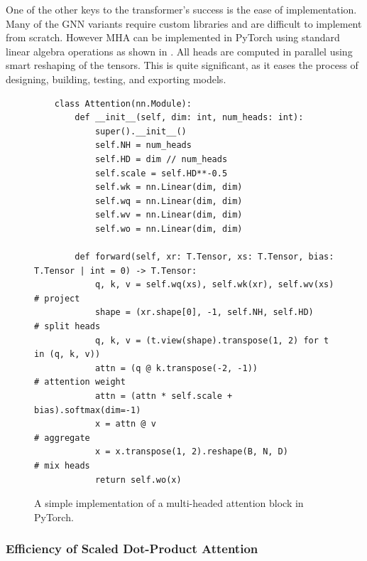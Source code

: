 One of the other keys to the transformer's success is the ease of implementation.
Many of the GNN variants require custom libraries and are difficult to implement from scratch.
However MHA can be implemented in PyTorch using standard linear algebra operations as shown in .
All heads are computed in parallel using smart reshaping of the tensors.
This is quite significant, as it eases the process of designing, building, testing, and exporting models.
\begin{figure}
    \centering
    \scriptsize
    \begin{verbatim}
    class Attention(nn.Module):
        def __init__(self, dim: int, num_heads: int):
            super().__init__()
            self.NH = num_heads
            self.HD = dim // num_heads
            self.scale = self.HD**-0.5
            self.wk = nn.Linear(dim, dim)
            self.wq = nn.Linear(dim, dim)
            self.wv = nn.Linear(dim, dim)
            self.wo = nn.Linear(dim, dim)

        def forward(self, xr: T.Tensor, xs: T.Tensor, bias: T.Tensor | int = 0) -> T.Tensor:
            q, k, v = self.wq(xs), self.wk(xr), self.wv(xs)              # project
            shape = (xr.shape[0], -1, self.NH, self.HD)                  # split heads
            q, k, v = (t.view(shape).transpose(1, 2) for t in (q, k, v))
            attn = (q @ k.transpose(-2, -1))                             # attention weight
            attn = (attn * self.scale + bias).softmax(dim=-1)
            x = attn @ v                                                 # aggregate
            x = x.transpose(1, 2).reshape(B, N, D)                       # mix heads
            return self.wo(x)
    \end{verbatim}
    \caption{A simple implementation of a multi-headed attention block in PyTorch.}
    \label{code:attention}
\end{figure}

\subsubsection{Efficiency of Scaled Dot-Product Attention}

